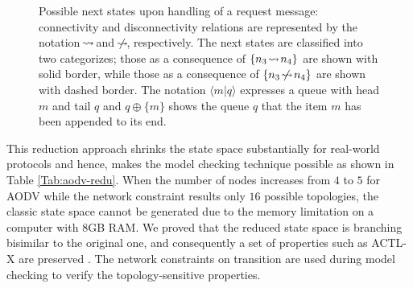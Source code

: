 \begin{figure}
   	\caption{Possible next states upon handling of a request message: connectivity and disconnectivity relations are represented by the notation $\!\rightsquigarrow\! $ and $\!\mathrel{\hspace{.1em}\not\hspace{-.1em}\rightsquigarrow}\!$, respectively. The next states are classified into two categorizes; those as a consequence of $\{n_3\!\rightsquigarrow\! n_4\}$ are shown with solid border, while those as a consequence of $\{n_3\!\mathrel{\hspace{.1em}\not\hspace{-.1em}\rightsquigarrow}\! n_4\}$ are shown with dashed border. The notation $\langle m|q\rangle$ expresses a queue with head $m$ and tail $q$ and $q\oplus\{m\}$ shows the queue $q$ that the item $m$ has been appended to its end.}\label{Fig::reduction}
\end{figure}

This reduction approach shrinks the state space substantially for real-world protocols and hence, makes the model checking technique possible as shown in Table \ref{Tab:aodv-redu}. When the number of nodes increases from $4$ to $5$ for AODV while the network constraint results only $16$ possible topologies, the classic state space cannot be generated due to the memory limitation on a computer with $8${GB} {RAM}.  We proved that the reduced state space is branching bisimilar to the
original one, and consequently a set of properties such as {ACTL-X} are preserved \cite{FOAC}. The network constraints on transition are used during model checking \cite{FORM,CSI2018} to verify the topology-sensitive properties. 

